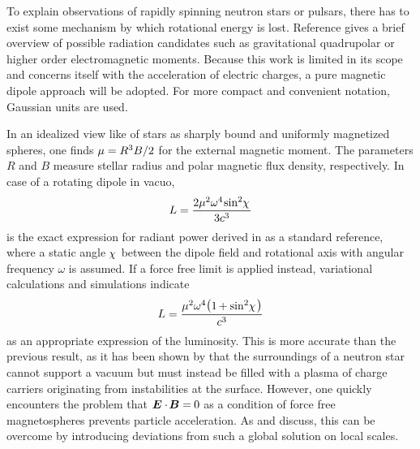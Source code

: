 To explain observations of rapidly spinning neutron stars or pulsars, there has to exist some mechanism by which rotational energy is
lost. Reference \cite{Alvarez_2004} gives a brief overview of possible radiation candidates such as gravitational quadrupolar or
higher order electromagnetic moments. Because this work is limited in its scope and concerns itself with the acceleration of
electric charges, a pure magnetic dipole approach will be adopted. For more compact and convenient notation, Gaussian units are used.

In an idealized view like \cite{Deutsch_1955} of stars as sharply bound and uniformly magnetized spheres, one finds
$\mu = \kern-0.1pt R^3 B / 2$ for the external magnetic moment. The parameters $R$ and $B$ measure stellar radius and polar magnetic
flux density, respectively. In case of a rotating dipole in vacuo,
\begin{equation}
	L = \frac{2\mu^2 \omega^4 \kern-1.0pt \sin^2 \kern-2.0pt \chi \kern+1.0pt}{3c^3}
	\label{eqn:vacuum}
\end{equation}
is the exact expression for radiant power derived in \cite{Jackson_1999} as a standard reference, where a static angle
$\kern-1.0pt \chi \kern+1.0pt$ between the dipole field and rotational axis with angular frequency $\omega$ is assumed. If
a force free limit is applied instead, variational calculations \cite{Gruzinov_2006} and simulations \cite{Spitkovsky_2006} indicate
\begin{equation}
	L = \frac{\mu^2 \omega^4 \raisebox{0.15ex}{\( \bigl(
	\raisebox{-0.15ex}{\( 1 \kern-0.7pt + \sin^2 \kern-2.0pt \chi \kern+1.0pt \)} \bigr) \)} }{c^3}
	\label{eqn:ffe-mhd}
\end{equation}
as an appropriate expression of the luminosity. This is more accurate than the previous result, as it has been
shown by \cite{Goldreich_1969} that the surroundings of a neutron star cannot support a vacuum but must instead be filled with a
plasma of charge carriers originating from instabilities at the surface. However, one quickly encounters the problem that
$\bm{E} \cdot \kern-1.0pt \bm{B} = \kern-0.5pt 0$ as a condition of force free magnetospheres prevents particle acceleration. As
\cite{Li_2012} and \cite{Gralla_2019} discuss, this can be overcome by introducing deviations from such a global solution on local
scales.

